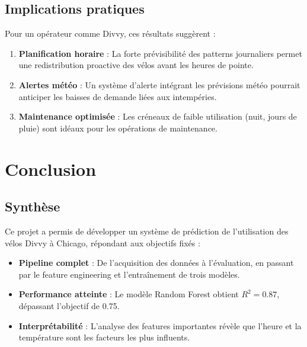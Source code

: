 \documentclass[12pt,a4paper]{article}
\begin{document}
\subsection{Implications pratiques}

Pour un opérateur comme Divvy, ces résultats suggèrent :

\begin{enumerate}
    \item \textbf{Planification horaire} : La forte prévisibilité des patterns journaliers permet une redistribution proactive des vélos avant les heures de pointe.
    
    \item \textbf{Alertes météo} : Un système d'alerte intégrant les prévisions météo pourrait anticiper les baisses de demande liées aux intempéries.
    
    \item \textbf{Maintenance optimisée} : Les créneaux de faible utilisation (nuit, jours de pluie) sont idéaux pour les opérations de maintenance.
\end{enumerate}

\section{Conclusion}

\subsection{Synthèse}

Ce projet a permis de développer un système de prédiction de l'utilisation des vélos Divvy à Chicago, répondant aux objectifs fixés :

\begin{itemize}
    \item \textbf{Pipeline complet} : De l'acquisition des données à l'évaluation, en passant par le feature engineering et l'entraînement de trois modèles.
    
    \item \textbf{Performance atteinte} : Le modèle Random Forest obtient $R^2 = 0.87$, dépassant l'objectif de 0.75.
    
    \item \textbf{Interprétabilité} : L'analyse des features importantes révèle que l'heure et la température sont les facteurs les plus influents.
\end{itemize}
\end{document}
